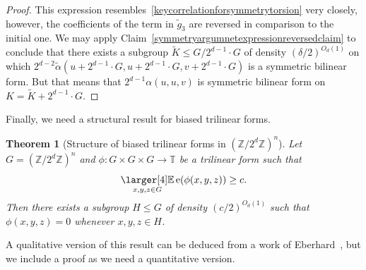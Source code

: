 \documentclass[a4paper,11pt]{article}
\newtheorem{theorem}{Theorem}
\numberwithin{theorem}{section}
\theoremstyle{definition}
\newcommand{\on}[1]{
	\operatorname{#1}
}
\newcommand{\exx}{
  \mathop{
    \mathchoice{\vcenter{\hbox{\larger[4]$\mathbb{E}$}}}
               {\kern0pt\mathbb{E}}
               {\kern0pt\mathbb{E}}
               {\kern0pt\mathbb{E}}
  }\displaylimits
}
\begin{document}
\begin{proof}
    This expression resembles~\eqref{keycorrelationforsymmetrytorsion} very closely, however, the coefficients of the term in $\tilde{g}_3$ are reversed in comparison to the initial one. We may apply Claim~\ref{symmetryargumnetexpressionreversedclaim} to conclude that there exists a subgroup $\tilde{K} \leq G/2^{d-1} \cdot G$ of density $(\delta/2)^{O_d(1)}$ on which $2^{d-2}\tilde{\alpha}(u + 2^{d-1} \cdot G,u + 2^{d-1} \cdot G, v + 2^{d-1} \cdot G)$ is a symmetric bilinear form. But that means that $2^{d-1}\alpha(u,u,v)$ is symmetric bilinear form on $K = \tilde{K} + 2^{d-1} \cdot G$.
    
    
\end{proof}

Finally, we need a structural result for biased trilinear forms.

\begin{theorem}[Structure of biased trilinear forms in $(\mathbb{Z}/2^d\mathbb{Z})^n$]\label{biasedinversetorsion}
    Let $G = (\mathbb{Z}/2^d\mathbb{Z})^n$ and $\phi : G \times G \times G \to \mathbb{T}$ be a trilinear form such that 
    \[\exx_{x,y,z \in G} \on{e}(\phi(x,y,z)) \geq c.\]
    Then there exists a subgroup $H \leq G$ of density $(c/2)^{O_d(1)}$ such that $\phi(x,y,z) = 0$ whenever $x,y,z \in H$.
\end{theorem}

A qualitative version of this result can be deduced from a work of Eberhard~\cite{Eberhard}, but we include a proof as we need a quantitative version.
\end{document}
